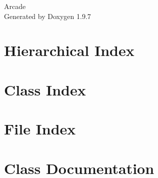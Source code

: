 \documentclass[twoside]{book}
\newcommand{\+}{\discretionary{\mbox{\scriptsize$\hookleftarrow$}}{}{}}
\newcommand{\clearemptydoublepage}{%
    \newpage{\pagestyle{empty}\cleardoublepage}%
  }
\begin{document}
  \raggedbottom
    \hypersetup{pageanchor=false,
                bookmarksnumbered=true,
                pdfencoding=unicode
               }
  \begin{titlepage}
  \vspace*{7cm}
  \begin{center}%
  {\Large Arcade}\\
  \vspace*{1cm}
  {\large Generated by Doxygen 1.9.7}\\
  \end{center}
  \end{titlepage}
  \clearemptydoublepage
  \tableofcontents
  \clearemptydoublepage
  \hypersetup{pageanchor=true}
\chapter{Hierarchical Index}

\chapter{Class Index}

\chapter{File Index}

\chapter{Class Documentation}






















































\end{document}
